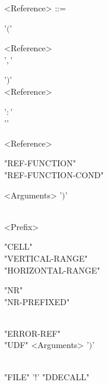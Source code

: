 \begin{grammar}
		<Reference> ::= \begin{syntdiag}[\footnotesize\sdlengths]
		\begin{stack} '$($' \begin{rep} <Reference> \\  '$,$' \end{rep} '$)$' \\
		<Reference> \begin{stack} '$:$' \\ '' \end{stack} <Reference> \\
		\begin{stack} "REF-FUNCTION" \\ "REF-FUNCTION-COND" \end{stack} <Arguments> '$)$' \\
		\begin{stack} \\
		<Prefix>
		\end{stack}
		\begin{stack}
			"CELL" \\
			"VERTICAL-RANGE" \\
			"HORIZONTAL-RANGE" \\
			\begin{stack} "NR" \\ "NR-PREFIXED" \end{stack} \\
			"ERROR-REF" \\
			"UDF" <Arguments> '$)$'
		\end{stack}
		\\"FILE" '$!$' "DDECALL"
		\end{stack}
		\end{syntdiag}
	\end{grammar}
